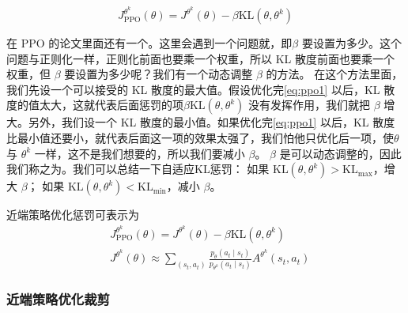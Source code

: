 \begin{equation}
    \label{eq:ppo1}
    J_{\mathrm{PPO}}^{\theta^{k}}(\theta)=J^{\theta^{k}}(\theta)-\beta \mathrm{KL}\left(\theta, \theta^{k}\right)
\end{equation}


在 PPO 的论文里面还有一个。这里会遇到一个问题就，即$\beta$  要设置为多少。这个问题与正则化一样，正则化前面也要乘一个权重，所以 KL 散度前面也要乘一个权重，但 $\beta$  要设置为多少呢？我们有一个动态调整 $\beta$ 的方法。
在这个方法里面，我们先设一个可以接受的 KL 散度的最大值。假设优化完\eqref{eq:ppo1} 以后，KL 散度的值太大，这就代表后面惩罚的项$\beta \mathrm{KL}\left(\theta, \theta^{k}\right)$ 没有发挥作用，我们就把 $\beta$ 增大。另外，我们设一个 KL 散度的最小值。如果优化完\eqref{eq:ppo1} 以后，KL 散度比最小值还要小，就代表后面这一项的效果太强了，我们怕他只优化后一项，使$\theta$ 与 $\theta^k$ 一样，这不是我们想要的，所以我们要减小 $\beta$。
$\beta$ 是可以动态调整的，因此我们称之为。我们可以总结一下自适应KL惩罚：
如果 $\mathrm{KL}(\theta,\theta^k)>\mathrm{KL}_{\max}$，增大 $\beta$；
如果 $\mathrm{KL}(\theta,\theta^k)<\mathrm{KL}_{\min}$，减小 $\beta$。

近端策略优化惩罚可表示为
\begin{equation}
    \label{eq:ppo-penalty}
    \begin{aligned}
        &J_{\text{PPO}}^{\theta^{k}}(\theta)=J^{\theta^{k}}(\theta)-\beta \text{KL}\left(\theta, \theta^{k}\right) \\
        &J^{\theta^{k}}(\theta) \approx \sum_{\left(s_{t}, a_{t}\right)} \frac{p_{\theta}\left(a_{t} \mid s_{t}\right)}{p_{\theta^{k}}\left(a_{t} \mid s_{t}\right)} A^{\theta^{k}}\left(s_{t}, a_{t}\right)
        \end{aligned}
\end{equation}

\subsubsection{近端策略优化裁剪} 


